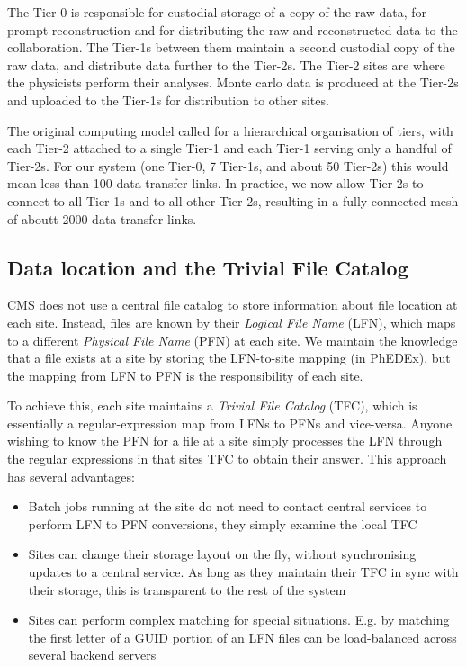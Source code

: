 The Tier-0 is responsible for custodial storage of a copy of the raw data, for prompt 
reconstruction and for distributing the raw and reconstructed data to the collaboration. The 
Tier-1s between them maintain a second custodial copy of the raw data, and distribute data further 
to the Tier-2s. The Tier-2 sites are where the physicists perform their analyses. Monte carlo data 
is produced at the Tier-2s and uploaded to the Tier-1s for distribution to other sites.

The original computing model called for a hierarchical organisation of tiers, with each Tier-2 
attached to a single Tier-1 and each Tier-1 serving only a handful of Tier-2s. For our system (one 
Tier-0, 7 Tier-1s, and about 50 Tier-2s) this would mean less than 100 data-transfer links. In 
practice, we now allow Tier-2s to connect to all Tier-1s and to all other Tier-2s, resulting in a 
fully-connected mesh of aboutt 2000 data-transfer links.

\subsection{Data location and the Trivial File Catalog}
CMS does not use a central file catalog to store information about file location at each site. 
Instead, files are known by their {\it Logical File Name} (LFN), which maps to a different {\it 
Physical File Name} (PFN) at each site. We maintain the knowledge that a file exists at a site by 
storing the LFN-to-site mapping (in PhEDEx), but the mapping from LFN to PFN is the responsibility 
of each site.

To achieve this, each site maintains a {\it Trivial File Catalog} (TFC), which is essentially a 
regular-expression map from LFNs to PFNs and vice-versa. Anyone wishing to know the PFN for a file 
at a site simply processes the LFN through the regular expressions in that sites TFC to obtain 
their answer. This approach has several advantages:

\begin{itemize}
  \item Batch jobs running at the site do not need to contact central services to perform LFN to 
PFN conversions, they simply examine the local TFC
  \item Sites can change their storage layout on the fly, without synchronising updates to a 
central service. As long as they maintain their TFC in sync with their storage, this is 
transparent to the rest of the system
  \item Sites can perform complex matching for special situations. E.g. by matching the first 
letter of a GUID portion of an LFN files can be load-balanced across several backend servers
\end{itemize}
